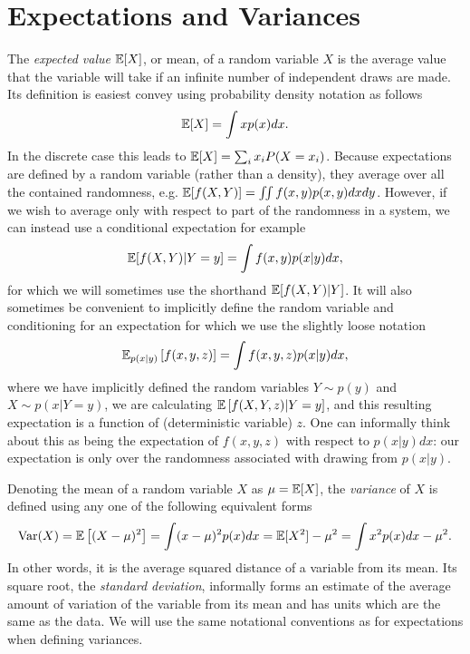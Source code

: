 \section{Expectations and Variances}
\label{sec:prob:expt}

The \emph{expected value} $\mathbb{E} [X]$, or mean, of a random variable $X$ is the average value that the variable
will take if an infinite number of independent draws are made.  Its definition is easiest convey using 
probability density notation as follows
\begin{align}
\label{eq:prob:expt}
\mathbb{E} [X] = \int x p(x)dx.
\end{align}
In the discrete case this leads to $\mathbb{E} [X] = \sum_{i} x_i P(X=x_i)$.  Because expectations are defined by a random
variable (rather than a density), they
average over all the contained randomness, e.g. $\mathbb{E} [f(X,Y)]=\iint f(x,y) p(x,y)dxdy$.  However, if we
wish to average only with respect to part of the randomness in a system, we can instead use a conditional
expectation for example
\begin{align}
\label{eq:prob:cond-expt}
\mathbb{E} [f(X,Y) | Y=y] = \int f(x,y) p(x|y) dx,
\end{align}
for which we will sometimes use the shorthand $\mathbb{E} [f(X,Y) | Y]$.
It will also sometimes be convenient to implicitly define the random variable and conditioning for an 
expectation for which we use the slightly loose notation
\begin{align}
\label{eq:prob:expt-2}
\mathbb{E}_{p(x|y)} \left[f(x,y,z)\right] = \int f(x,y,z) p(x|y) dx,
\end{align}
where we have implicitly defined the random variables $Y \sim p(y)$ and $X \sim p(x | Y=y)$,
we are calculating $\mathbb{E} \left[f(X,Y,z) | Y=y\right]$,
and this resulting expectation is a function of (deterministic variable) $z$.  One can informally think about this
as being the expectation of $f(x,y,z)$ with respect to $p(x|y)dx$:
our expectation is only over the randomness associated with drawing from $p(x|y)$.  

Denoting the mean of a random variable $X$ as $\mu=\mathbb{E} [X]$, the \emph{variance} of $X$
is defined using any one of the following equivalent forms
\begin{align}
\mathrm{Var} (X) = \mathbb{E} \left[(X-\mu)^2\right] = \int (x-\mu)^2 p(x)dx = \mathbb{E} [X^2] - \mu^2 =
\int x^2 p(x) dx - \mu^2.
\end{align}
In other words, it is the average squared distance of a variable from its mean.
Its square root, the \emph{standard deviation}, informally forms an estimate of the average
amount of variation of the variable from its mean and has units which are the same
as the data.  We will use the same notational conventions as for expectations when defining
variances.

